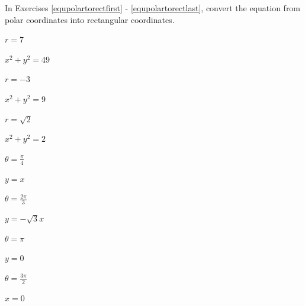 \documentclass{ximera}
\begin{document}
\begin{question}
In Exercises \ref{equpolartorectfirst} - \ref{equpolartorectlast}, convert the equation from polar coordinates into rectangular coordinates.  

\begin{problem} \label{equpolartorectfirst}
$r = 7$ 

\begin{solution}
$x^{2} + y^{2} = 49$
\end{solution}
\end{problem}

\begin{problem}
$r = -3$

\begin{solution}
$x^{2} + y^{2} = 9$
\end{solution}
\end{problem}

\begin{problem}
$r = \sqrt{2}$

\begin{solution}
$x^{2} + y^{2} = 2$
\end{solution}
\end{problem}

\begin{problem}
$\theta = \frac{\pi}{4}$

\begin{solution}
$y=x$
\end{solution}
\end{problem}

\begin{problem}
$\theta = \frac{2\pi}{3}$

\begin{solution}
$y = -\sqrt{3}x$
\end{solution}
\end{problem}

\begin{problem}
$\theta = \pi$

\begin{solution}
 $y=0$
\end{solution}
\end{problem}

\begin{problem}
$\theta = \frac{3\pi}{2}$

\begin{solution}
$x=0$
\end{solution}
\end{problem}


\end{question}
\end{document}
